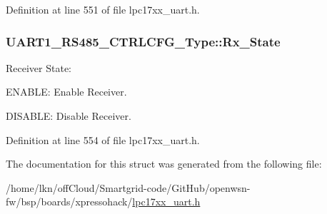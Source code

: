 Definition at line 551 of file lpc17xx\+\_\+uart.\+h.

\subsubsection[{\texorpdfstring{Rx\+\_\+\+State}{Rx_State}}]{ U\+A\+R\+T1\+\_\+\+R\+S485\+\_\+\+C\+T\+R\+L\+C\+F\+G\+\_\+\+Type\+::\+Rx\+\_\+\+State}\hypertarget{struct_u_a_r_t1___r_s485___c_t_r_l_c_f_g___type_a087a5f4310b65eaf41efc5295b8b841e}{}\label{struct_u_a_r_t1___r_s485___c_t_r_l_c_f_g___type_a087a5f4310b65eaf41efc5295b8b841e}
Receiver State\+:
\begin{DoxyItemize}
\item E\+N\+A\+B\+LE\+: Enable Receiver.
\item D\+I\+S\+A\+B\+LE\+: Disable Receiver. 
\end{DoxyItemize}

Definition at line 554 of file lpc17xx\+\_\+uart.\+h.



The documentation for this struct was generated from the following file\+:\begin{DoxyCompactItemize}
\item 
/home/lkn/off\+Cloud/\+Smartgrid-\/code/\+Git\+Hub/openwsn-\/fw/bsp/boards/xpressohack/\hyperlink{lpc17xx__uart_8h}{lpc17xx\+\_\+uart.\+h}\end{DoxyCompactItemize}
